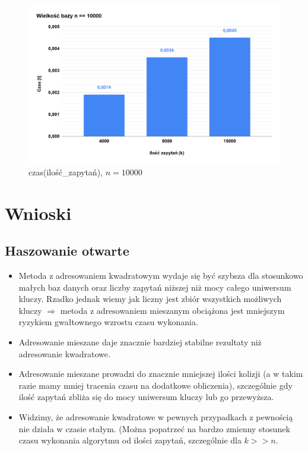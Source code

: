 \documentclass{article}
\begin{document}
\begin{figure}[H]
	\centering
	\includegraphics[scale=0.22]{ln10k.png}
	\caption{czas(ilość\_zapytań), $n = 10000$}
	\label{fig:ln10k}
\end{figure}

\section{Wnioski}
\subsection{Haszowanie otwarte}
\begin{itemize}
	\item Metoda z adresowaniem kwadratowym wydaje się być szybsza dla stosunkowo małych baz danych oraz liczby zapytań niższej niż mocy całego uniwersum kluczy. Rzadko jednak wiemy jak liczny jest zbiór wszystkich możliwych kluczy $\Rightarrow$  metoda z adresowaniem mieszanym obciążona jest mniejszym ryzykiem gwałtownego wzrostu czasu wykonania.
	\item Adresowanie mieszane daje znacznie bardziej stabilne rezultaty niż adresowanie kwadratowe.
	\item Adresowanie mieszane prowadzi do znacznie mniejszej ilości kolizji (a w takim razie mamy mniej tracenia czasu na dodatkowe obliczenia), szczególnie gdy ilość zapytań zbliża się do mocy uniwersum kluczy lub go przewyższa. 
	\item Widzimy, że adresowanie kwadratowe w pewnych przypadkach z pewnością nie działa w czasie stałym. (Można popatrzeć na bardzo zmienny stosunek czasu wykonania algorytmu od ilości zapytań, szczególnie dla $k >> n$.
\end{itemize}
\end{document}
